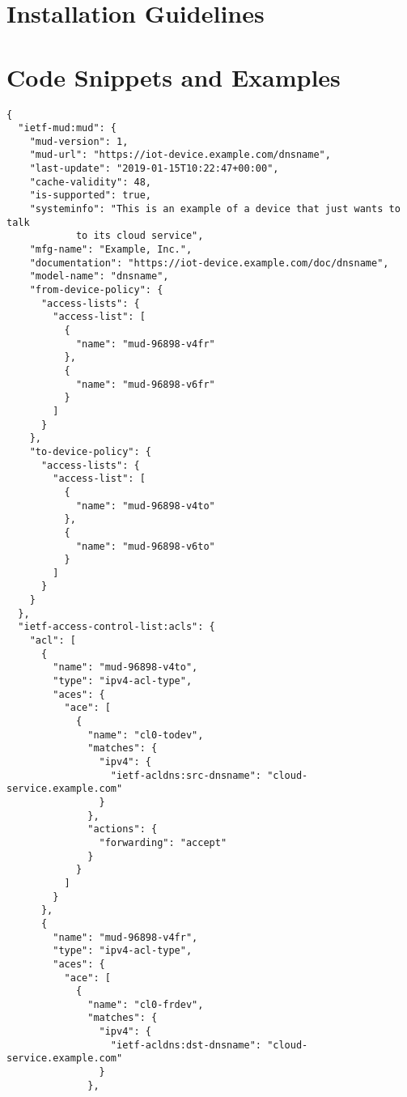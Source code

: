 \appendix

\chapter{Installation Guidelines}


\chapter{Code Snippets and Examples}

\label{code:mud-example}
\begin{verbatim}
{
  "ietf-mud:mud": {
    "mud-version": 1,
    "mud-url": "https://iot-device.example.com/dnsname",
    "last-update": "2019-01-15T10:22:47+00:00",
    "cache-validity": 48,
    "is-supported": true,
    "systeminfo": "This is an example of a device that just wants to talk
		    to its cloud service",
    "mfg-name": "Example, Inc.",
    "documentation": "https://iot-device.example.com/doc/dnsname",
    "model-name": "dnsname",
    "from-device-policy": {
      "access-lists": {
        "access-list": [
          {
            "name": "mud-96898-v4fr"
          },
          {
            "name": "mud-96898-v6fr"
          }
        ]
      }
    },
    "to-device-policy": {
      "access-lists": {
        "access-list": [
          {
            "name": "mud-96898-v4to"
          },
          {
            "name": "mud-96898-v6to"
          }
        ]
      }
    }
  },
  "ietf-access-control-list:acls": {
    "acl": [
      {
        "name": "mud-96898-v4to",
        "type": "ipv4-acl-type",
        "aces": {
          "ace": [
            {
              "name": "cl0-todev",
              "matches": {
                "ipv4": {
                  "ietf-acldns:src-dnsname": "cloud-service.example.com"
                }
              },
              "actions": {
                "forwarding": "accept"
              }
            }
          ]
        }
      },
      {
        "name": "mud-96898-v4fr",
        "type": "ipv4-acl-type",
        "aces": {
          "ace": [
            {
              "name": "cl0-frdev",
              "matches": {
                "ipv4": {
                  "ietf-acldns:dst-dnsname": "cloud-service.example.com"
                }
              },

\end{verbatim}
